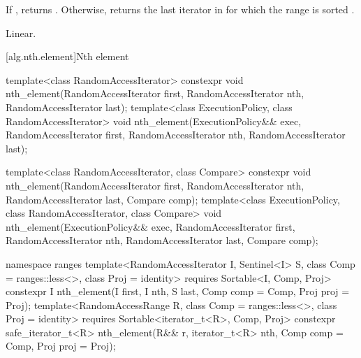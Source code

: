 \begin{itemdescr}
\pnum
\returns If , returns
. Otherwise, returns
the last iterator  in  for which the
range  is sorted .

\pnum
\complexity Linear.
\end{itemdescr}


[alg.nth.element]{Nth element}

%
\begin{itemdecl}
template<class RandomAccessIterator>
  constexpr void nth_element(RandomAccessIterator first, RandomAccessIterator nth,
                             RandomAccessIterator last);
template<class ExecutionPolicy, class RandomAccessIterator>
  void nth_element(ExecutionPolicy&& exec,
                   RandomAccessIterator first, RandomAccessIterator nth,
                   RandomAccessIterator last);

template<class RandomAccessIterator, class Compare>
  constexpr void nth_element(RandomAccessIterator first, RandomAccessIterator nth,
                             RandomAccessIterator last,  Compare comp);
template<class ExecutionPolicy, class RandomAccessIterator, class Compare>
  void nth_element(ExecutionPolicy&& exec,
                   RandomAccessIterator first, RandomAccessIterator nth,
                   RandomAccessIterator last, Compare comp);
\end{itemdecl}
\begin{addedblock}
\begin{itemdecl}
namespace ranges {
  template<RandomAccessIterator I, Sentinel<I> S, class Comp = ranges::less<>,
      class Proj = identity>
    requires Sortable<I, Comp, Proj>
    constexpr I
      nth_element(I first, I nth, S last, Comp comp = Comp{}, Proj proj = Proj{});
  template<RandomAccessRange R, class Comp = ranges::less<>, class Proj = identity>
    requires Sortable<iterator_t<R>, Comp, Proj>
    constexpr safe_iterator_t<R>
      nth_element(R&& r, iterator_t<R> nth, Comp comp = Comp{}, Proj proj = Proj{});
}
\end{itemdecl}
\end{addedblock}


